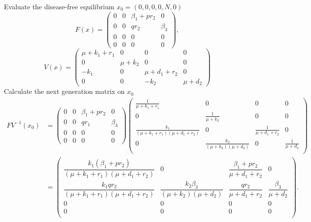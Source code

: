 Evaluate the disease-free equilibrium $x_0 = \left(0, 0, 0, 0, N, 0 \right)$ 
\begin{equation*}
    F(x) = 
        \begin{pmatrix}
            0 & 0 & \beta_{1} + p r_2 & 0 \\
            0 & 0 &   q r_2  &   \beta_{3} \\
    		0 & 0 & 0 & 0 \\
		    0 & 0 & 0 & 0
        \end{pmatrix},
\end{equation*}
\begin{equation*}
    V(x) =
        \begin{pmatrix}
            \mu + k_1 + r_1 & 0 & 0 & 0 \\
            0 & \mu + k_2 & 0 & 0 \\
            -k_1 & 0 & \mu + d_1 + r_2 & 0 \\
            0 & 0 & -k_2 & \mu + d_2
        \end{pmatrix}
\end{equation*}
Calculate the next generation matrix on $x_0$
\begin{align*}	
	FV^{-1}(x_0) 
	&=  
    \begin{pmatrix}
        0 & 0 & \beta_{1} + p r_2 & 0 \\
        0 & 0 &   q r_1  &   \beta_{3} \\
		0 & 0 & 0 & 0 \\
	    0 & 0 & 0 & 0
    \end{pmatrix}
	\begin{pmatrix}
		\frac{1}{\mu + k_1 + r_1} & 0 & 0 & 0 \\
		0 & \frac{1}{\mu + k_2} & 0 & 0 \\
		\frac{k_1}{(\mu + k_1 + r_1)(\mu + d_1 +r_2)} & 0 & \frac{1}{\mu + d_1 +r_2} & 0 \\
		0 & \frac{k_2}{(\mu + k_2)(\mu + d_2)} & 0 & \frac{1}{\mu + d_2} \\
	\end{pmatrix}  \\
	&= 
	\begin{pmatrix}
		\dfrac{k_1(\beta_1 + pr_2)}{(\mu + k_1 + r_1)(\mu + d_1 +r_2)} 
        & 0 & \dfrac{\beta_1 + pr_2}{\mu + d_1 +r_2} & 0 
    \\
		\dfrac{k_1 q r_2}{(\mu + k_1 + r_1)(\mu + d_1 +r_2)} 
			& \dfrac{k_2 \beta_3}{(\mu + k_2)(\mu + d_2)} 
      & \dfrac{qr_2}{\mu + d_1 +r_2} & \dfrac{\beta_3}{\mu + d_2} 
    \\
		0 & 0 & 0 & 0 
		\\
		0 & 0 & 0 & 0 
		\\
	\end{pmatrix}.
\end{align*}
